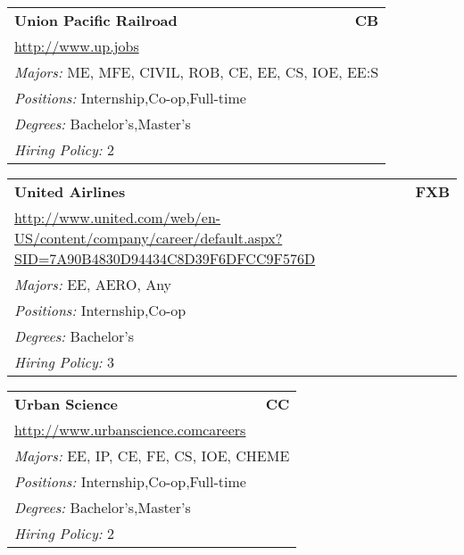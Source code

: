 \documentclass[twoside]{article}
\begin{document}
\begin{center}
\begin{multicols}{3}
\begin{FlushLeft}
\begin{minipage}{.9\columnwidth}
\end{minipage}
 
\begin{minipage}{.9\columnwidth}\begin{tabularx}{.95\columnwidth}{Xr}
                 {\Large\bf Union Pacific Railroad} & {\Large\bf CB}\\
    \multicolumn{2}{p{.95\columnwidth}}{\url{http://www.up.jobs}}\\
    \multicolumn{2}{p{.95\columnwidth}}{\emph{Majors:} ME, MFE, CIVIL, ROB, CE, EE, CS, IOE, EE:S}\\
    \multicolumn{2}{p{.95\columnwidth}}{\emph{Positions:} Internship,Co-op,Full-time}\\
    \multicolumn{2}{p{.95\columnwidth}}{\emph{Degrees:} Bachelor's,Master's}\\
    \multicolumn{2}{p{.95\columnwidth}}{\emph{Hiring Policy:} 2}\\
    \end{tabularx}
    
\end{minipage}
 
\begin{minipage}{.9\columnwidth}\begin{tabularx}{.95\columnwidth}{Xr}
                 {\Large\bf United Airlines} & {\Large\bf FXB}\\
    \multicolumn{2}{p{.95\columnwidth}}{\url{http://www.united.com/web/en-US/content/company/career/default.aspx?SID=7A90B4830D94434C8D39F6DFCC9F576D}}\\
    \multicolumn{2}{p{.95\columnwidth}}{\emph{Majors:} EE, AERO, Any}\\
    \multicolumn{2}{p{.95\columnwidth}}{\emph{Positions:} Internship,Co-op}\\
    \multicolumn{2}{p{.95\columnwidth}}{\emph{Degrees:} Bachelor's}\\
    \multicolumn{2}{p{.95\columnwidth}}{\emph{Hiring Policy:} 3}\\
    \end{tabularx}
    
\end{minipage}
 
\begin{minipage}{.9\columnwidth}\begin{tabularx}{.95\columnwidth}{Xr}
                 {\Large\bf Urban Science} & {\Large\bf CC}\\
    \multicolumn{2}{p{.95\columnwidth}}{\url{http://www.urbanscience.comcareers}}\\
    \multicolumn{2}{p{.95\columnwidth}}{\emph{Majors:} EE, IP, CE, FE, CS, IOE, CHEME}\\
    \multicolumn{2}{p{.95\columnwidth}}{\emph{Positions:} Internship,Co-op,Full-time}\\
    \multicolumn{2}{p{.95\columnwidth}}{\emph{Degrees:} Bachelor's,Master's}\\
    \multicolumn{2}{p{.95\columnwidth}}{\emph{Hiring Policy:} 2}\\
    \end{tabularx}
    

\end{minipage}
\end{FlushLeft}
\end{multicols}
\end{center}
\end{document}
